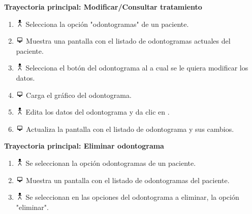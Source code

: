\textbf{Trayectoria principal: Modificar/Consultar tratamiento}        
\begin{enumerate}
\item \includegraphics[height=1em]{pictures/actor.png} Selecciona la opción "odontogramas" de un paciente.
\item \includegraphics[height=1em]{pictures/sistema.png} Muestra una pantalla con el listado de odontogramas actuales del paciente.
\item \includegraphics[height=1em]{pictures/actor.png} Selecciona el botón  del odontograma al a cual se le quiera modificar los datos.
\item \includegraphics[height=1em]{pictures/sistema.png} Carga el gráfico del odontograma.
\item \includegraphics[height=1em]{pictures/actor.png} Edita los datos del odontograma y da clic en .
\item \includegraphics[height=1em]{pictures/sistema.png} Actualiza la pantalla con el listado de odontograma y sus cambios.
\end{enumerate} \bigskip

\textbf{Trayectoria principal: Eliminar odontograma}  
\begin{enumerate}
\item \includegraphics[height=1em]{pictures/actor.png} Se seleccionan la opción odontogramas de un paciente.
\item \includegraphics[height=1em]{pictures/sistema.png} Muestra un pantalla con el listado de odontogramas del paciente.
\item \includegraphics[height=1em]{pictures/actor.png} Se seleccionan en las opciones del odontograma a eliminar, la opción "eliminar".
\end{enumerate} \bigskip


